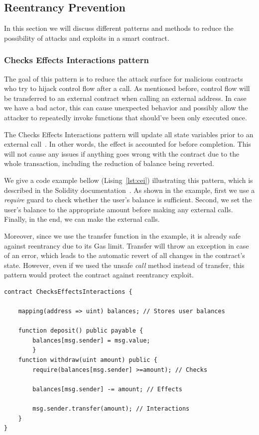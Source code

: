 \documentclass[10pt,conference]{IEEEtran}
\begin{document}
\subsection{Reentrancy Prevention}
In this section we will discuss different patterns and methods to reduce the possibility of attacks and exploits in a smart contract. 

\subsubsection{Checks Effects Interactions pattern}

The goal of this pattern is to reduce the attack surface for malicious contracts who try to hijack control flow after a call.  As mentioned before, control flow will be transferred to an external contract when calling an external address. In case we have a bad actor, this can cause unexpected behavior and possibly allow the attacker to repeatedly invoke functions that should've been only executed once. 

The Checks Effects Interactions pattern will update all state variables prior to an external call~\cite{cei}. In other words, the effect is accounted for before completion. This will not cause any issues if anything goes wrong with the contract due to the whole transaction, including the reduction of balance being reverted. 

We give a code example bellow (Lising~\ref{lst:cei}) illustrating this pattern, which is described in the Solidity documentation~\cite{solidity}. As shown in the example, first we use a \textit{require} guard to check whether the user's balance is sufficient. Second, we set the user's balance to the appropriate amount before making any external calls. Finally, in the end, we can make the external calls.

Moreover, since we use the transfer function in the example, it is already safe against reentrancy due to its Gas limit. Transfer will throw an exception in case of an error, which leads to the automatic revert of all changes in the contract's state. 
However, even if we used the unsafe \textit{call} method instead of transfer, this pattern would protect the contract against reentrancy exploit. 

\begin{lstlisting}[language=Solidity, caption=Checks Effects Interactions pattern, label={lst:cei}]
contract ChecksEffectsInteractions {
    
    mapping(address => uint) balances; // Stores user balances
    
    function deposit() public payable {
        balances[msg.sender] = msg.value;
        }
    function withdraw(uint amount) public {
        require(balances[msg.sender] >=amount); // Checks
        
        balances[msg.sender] -= amount; // Effects
        
        msg.sender.transfer(amount); // Interactions
    }
}

\end{lstlisting}
\end{document}
